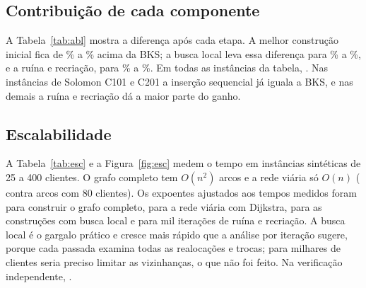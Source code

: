 \documentclass[12pt]{article}
\begin{document}
\begin{table}[!ht]
\centering
\footnotesize
\resizebox{\linewidth}{!}{\tabEntregas}
\caption{Entregas do Kaggle (grafo completo): efeito do peso $\lambda$ da prioridade.}
\label{tab:ent}
\end{table}

\subsection{Contribuição de cada componente}

A Tabela~\ref{tab:abl} mostra a diferença após cada etapa. A melhor construção inicial fica de \ablConstrMin\% a \ablConstrMax\% acima da BKS; a busca local leva essa diferença para \ablLocalMin\% a \ablLocalMax\%, e a ruína e recriação, para \ablFinalMin\% a \ablFinalMax\%. Em todas as instâncias da tabela, \ablNuncaPiorou. Nas instâncias de Solomon C101 e C201 a inserção sequencial já iguala a BKS, e nas demais a ruína e recriação dá a maior parte do ganho.

\begin{table}[!ht]
\centering
\small
\tabAblacao
\caption{Diferença para a BKS (\%) após cada etapa do solver.}
\label{tab:abl}
\end{table}

\subsection{Escalabilidade}

A Tabela~\ref{tab:esc} e a Figura~\ref{fig:esc} medem o tempo em instâncias sintéticas de 25 a 400 clientes. O grafo completo tem $O(n^2)$ arcos e a rede viária só $O(n)$ (\viarioArcosViario{} contra \viarioArcosCompleto{} arcos com 80 clientes). Os expoentes ajustados aos tempos medidos foram \expCompleto{} para construir o grafo completo, \expViario{} para a rede viária com Dijkstra, \expConstr{} para as construções com busca local e \expIter{} para mil iterações de ruína e recriação. A busca local é o gargalo prático e cresce mais rápido que a análise por iteração sugere, porque cada passada examina todas as realocações e trocas; para milhares de clientes seria preciso limitar as vizinhanças, o que não foi feito. Na verificação independente, \escalaTodasVerificadas.

\begin{table}[!ht]
\centering
\scriptsize
\setlength{\tabcolsep}{3pt}
\tabEscala
\caption{Tempos em segundos por fase, em instâncias sintéticas.}
\label{tab:esc}
\end{table}
\end{document}
